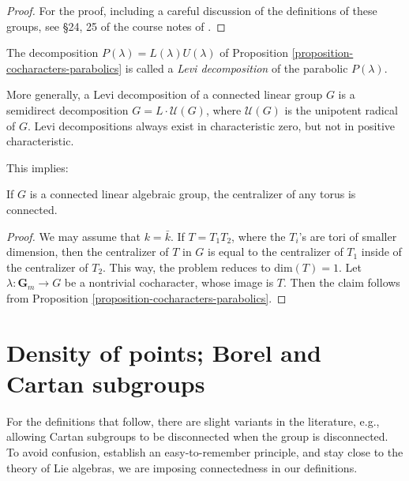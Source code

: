 \begin{proof}
 For the proof, including a careful discussion of the definitions of these groups, see \S 24, 25 of the course notes of \cite{Conrad-AG1}.
\end{proof}


\begin{definition}
 \label{definition-Levi-decomposition}
The decomposition $P(\lambda)=L(\lambda)U(\lambda)$ of Proposition \ref{proposition-cocharacters-parabolics} is called a \emph{Levi decomposition} of the parabolic $P(\lambda)$. 
\end{definition}

\begin{remark}
 \label{remark-general-Levi}
 More generally, a Levi decomposition of a connected linear group $G$ is a semidirect decomposition $G=L\cdot \mathcal U(G)$, where $\mathcal U(G)$ is the unipotent radical of $G$. Levi decompositions always exist in characteristic zero, but not in positive characteristic.
\end{remark}




This implies:

\begin{proposition}
\label{proposition-centralizers-tori-connected}
 If $G$ is a connected linear algebraic group, the centralizer of any torus is connected. 
\end{proposition}

\begin{proof}
 We may assume that $k=\bar k$. If $T=T_1T_2$, where the $T_i$'s are tori of smaller dimension, then the centralizer of $T$ in $G$ is equal to the centralizer of $T_1$ inside of the centralizer of $T_2$. This way, the problem reduces to $\text{dim}(T)=1$. Let $\lambda:\mathbf G_m\to G$ be a nontrivial cocharacter, whose image is $T$. Then the claim follows from Proposition \ref{proposition-cocharacters-parabolics}.
\end{proof}






\section{Density of points; Borel and Cartan subgroups}
\label{section-Cartan-Borel-group}

For the definitions that follow, there are slight variants in the literature, e.g., allowing Cartan subgroups to be disconnected when the group is disconnected. To avoid confusion, establish an easy-to-remember principle, and stay close to the theory of Lie algebras, we are imposing connectedness in our definitions.



